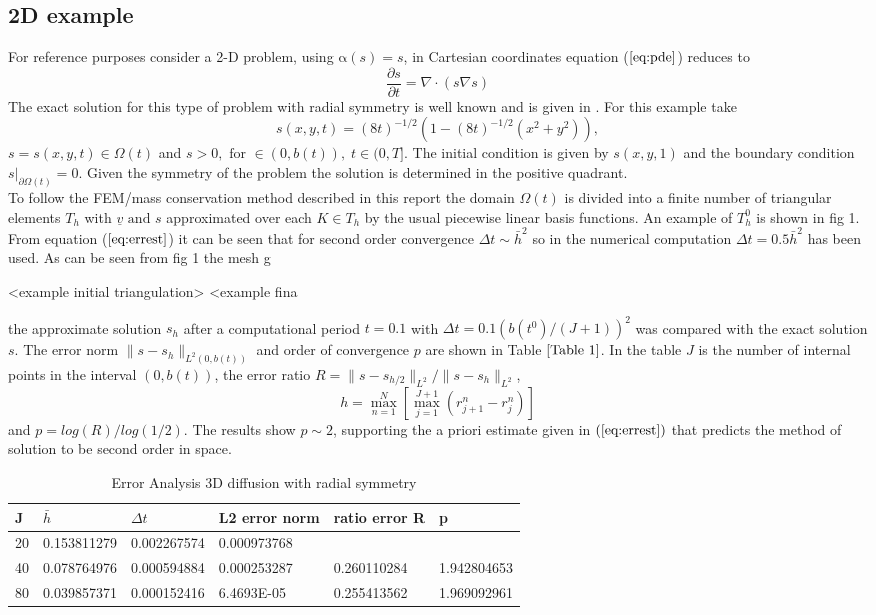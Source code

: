 \documentclass[11pt]{article}
\newcommand{\pl}{\partial}
\newcommand{\D}{\Delta}
\newcommand{\ul}{\underline}
\newcommand{\Om}{\Omega}
\newcommand{\al}{\mathrm{\alpha}}
\begin{document}
\subsection{2D example }
For reference purposes consider a 2-D problem, using $\al(s) = s$, in Cartesian coordinates equation ($\ref{eq:pde}$) reduces to
\begin{equation}
\label{eq:pde1}
\frac{\partial{s}}{\partial{t}} = \nabla\cdot\left(s\nabla{s}\right) 
\end{equation}
The exact solution for this type of problem with radial symmetry is well known and is given in \cite{Baines2006}. For this example take $$ s(x,y,t) =(8t)^{-1/2}\left(1 - (8t)^{-1/2}(x^{2}+y^2)\right),$$
$s = s(x,y,t) \in\Om (t)$ and $s > 0, \text{ for }  \in (0,b(t)), \;t\in(0,T]$. The initial condition is given by $s(x,y,1) $ and the boundary condition $s|_{\pl{\Om} (t) } =0$. Given the symmetry of the problem the solution is determined in the positive quadrant.\\
To follow the FEM/mass conservation method described in this report the domain $\Om(t)$ is divided into a finite number of triangular elements $T_h$ with $\ul{v} \text{ and } s$ approximated over each $K \in T_h$ by the usual piecewise linear basis functions. An example of $T_h^0$ is shown in fig 1. From equation ($\ref{eq:errest}$) it can be seen that for second order convergence $\D{t} \sim \bar{h}^2$ so in the numerical computation $\D t = 0.5\bar{h}^2$ has been used. As can be seen from fig 1 the mesh g


<example initial triangulation>
<example fina







the approximate solution $s_h$ after a computational period $t=0.1$ with $\D{t} = 0.1(b(t^0)/(J+1))^2$ was compared with the exact solution $s$. The error norm $\|s-s_h\|_{L^{2}(0,b(t))}$ and order of convergence $p$ are shown in Table $\ref{Table 1}$. In the table $J$ is the number of internal points in the interval $(0,b(t))$, the error ratio $R = \|s-s_{h/2}\|_{L^2}/\|s-s_h\|_{L^2}$, 
$$h = \max_{n=1}^N\left[\max_{j=1}^{J+1}{(r_{j+1}^n - r_j^n)}\right]$$ and $p = log(R)/log(1/2)$. The results show $p\sim 2$, supporting the a priori estimate given in $(\ref{eq:errest})$ that predicts the method of solution to be second order in space.

\begin{table}[]
\centering
\caption{Error Analysis 3D diffusion with radial symmetry}
\label{Table 1}
\begin{tabular}{|l|l|l|l|l|l|}
\hline
J	&$\bar{h}$	&$\D{t}$	&L2 error norm	&ratio error R	&p \\ \hline
20	&0.153811279	&0.002267574	&0.000973768	& &	\\ \hline
40	&0.078764976	&0.000594884	&0.000253287	&0.260110284	&1.942804653 \\ \hline
80	&0.039857371	&0.000152416	&6.4693E-05	&0.255413562	&1.969092961 \\ \hline
\end{tabular}
\end{table}
\end{document}
